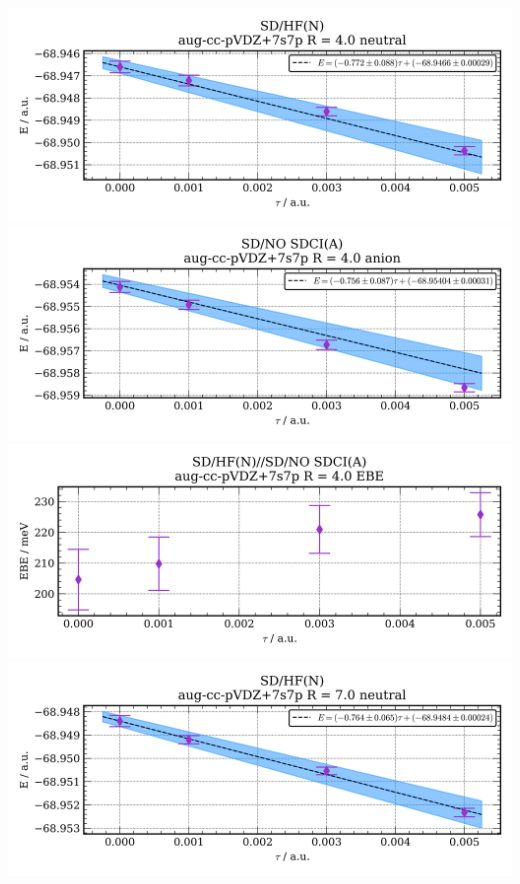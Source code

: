 \includegraphics[width=\textwidth,keepaspectratio]{images/SDshivHFupaNapushivshivSDshivNO_SDCIupaAapu__aug-cc-pvdz+7s7p__4p0_01_neutral.png}
\includegraphics[width=\textwidth,keepaspectratio]{images/SDshivHFupaNapushivshivSDshivNO_SDCIupaAapu__aug-cc-pvdz+7s7p__4p0_02_anion.png}
\includegraphics[width=\textwidth,keepaspectratio]{images/SDshivHFupaNapushivshivSDshivNO_SDCIupaAapu__aug-cc-pvdz+7s7p__4p0_03_ebe.png}
\includegraphics[width=\textwidth,keepaspectratio]{images/SDshivHFupaNapushivshivSDshivNO_SDCIupaAapu__aug-cc-pvdz+7s7p__7p0_01_neutral.png}

